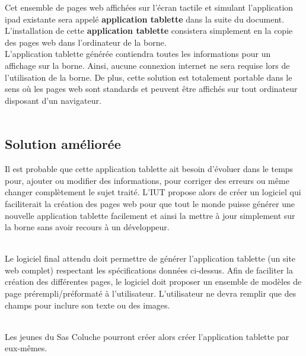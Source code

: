 \documentclass[11pt]{article}
\begin{document}
\danger Cet ensemble de pages web affichées sur l'écran tactile et simulant l'application ipad existante sera appelé \textbf{application tablette} dans la suite du document. L'installation de cette \textbf{application tablette} consistera simplement en la copie des pages web dans l'ordinateur de la borne.\\

L'application tablette générée contiendra toutes les informations pour un affichage sur la borne. Ainsi, aucune connexion internet ne sera requise lors de l'utilisation de la borne. De plus, cette solution est totalement portable dans le sens où les pages web sont standards et peuvent être affichés sur tout ordinateur disposant d'un navigateur.\\~

\subsection{Solution améliorée}
Il est probable que cette application tablette ait besoin d'évoluer dans le temps pour, ajouter ou modifier des informations, pour corriger des erreurs ou même changer complètement le sujet traité. L'IUT propose alors de créer un logiciel qui faciliterait la création des pages web pour que tout le monde puisse générer une nouvelle application tablette facilement et ainsi la mettre à jour simplement sur la borne sans avoir recours à un développeur.\\~

Le logiciel final attendu doit permettre de générer l'application tablette (un site web complet) respectant les spécifications données ci-dessus. Afin de faciliter la création des différentes pages, le logiciel doit proposer un ensemble de modèles de page prérempli/préformaté à l'utilisateur. L'utilisateur ne devra remplir que des champs pour inclure son texte ou des images.\\~

Les jeunes du Sas Coluche pourront créer alors créer l'application tablette par eux-mêmes.
\end{document}
